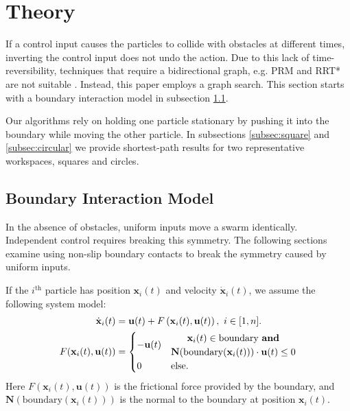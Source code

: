 \section{Theory}
\label{sec:theory}
If a control input causes the particles to collide with obstacles at different times, inverting the control input does not undo the action. Due to this lack of time-reversibility, techniques that require a bidirectional graph, e.g. PRM and RRT* are not suitable \cite{lavalle2006planning,kavraki1996probabilistic}. Instead, this paper employs a graph search. This section starts with a boundary interaction model in subsection \ref{subsec:WallFriction}.

Our algorithms rely on holding one particle stationary by pushing it into the boundary while moving the other particle. In subsections \ref{subsec:square} and \ref{subsec:circular} we provide shortest-path results for two representative workspaces, squares and circles.
\subsection{Boundary Interaction Model}\label{subsec:WallFriction}

In the absence of obstacles, uniform inputs move a swarm identically.  
Independent control requires breaking this symmetry. 
The following sections examine using non-slip boundary contacts to break the symmetry caused by uniform inputs.  
 
 If the $i^{\textrm{th}}$ particle has position $\mathbf{x}_i(t)$ and velocity $\dot{\mathbf{x}}_i(t)$,  we assume the following system model:
 \begin{align}\label{eq:swarmDynamicsAndFric} 
\dot{\mathbf{x}}_i(t)
 &=
 \mathbf{u}(t)
 +F \left( \mathbf{x}_i(t), \mathbf{u}(t) \right), ~i \in [1,n].\\
 F(\mathbf{x}_i(t), \mathbf{u}(t)) &= \begin{cases}
  - \mathbf{u}(t) &\begin{matrix} \mathbf{x}_i(t) \in  \textrm{boundary \textbf{and}}\\
\mathbf{N}(\textrm{boundary$(\mathbf{x}_i(t))$})\cdot   \mathbf{u}(t) \le 0 \end{matrix}
 \\
 0 & \textrm{else}.
 \end{cases}\nonumber
 \end{align}
 Here  $F(\mathbf{x}_i(t), \mathbf{u}(t)) $ is the frictional force provided by the boundary, and
 $\mathbf{N}(\textrm{boundary$(\mathbf{x}_i(t))$})$ is the normal to the boundary at position $\mathbf{x}_i(t)$.
 
